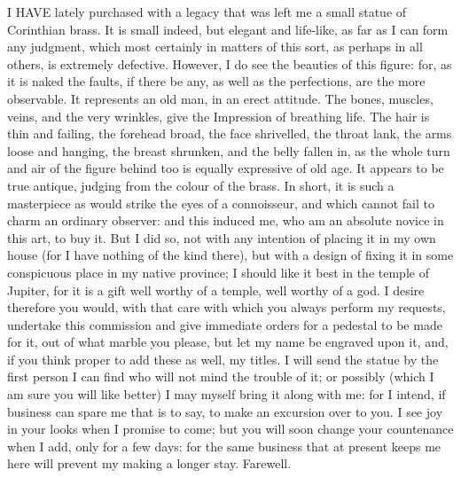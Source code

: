 
I HAVE lately purchased with a legacy that was left me a small statue of
Corinthian brass. It is small indeed, but elegant and life-like, as far as
I can form any judgment, which most certainly in matters of this sort, as
perhaps in all others, is extremely defective. However, I do see the
beauties of this figure: for, as it is naked the faults, if there be any,
as well as the perfections, are the more observable. It represents an old
man, in an erect attitude. The bones, muscles, veins, and the very
wrinkles, give the Impression of breathing life. The hair is thin and
failing, the forehead broad, the face shrivelled, the throat lank, the
arms loose and hanging, the breast shrunken, and the belly fallen in, as
the whole turn and air of the figure behind too is equally expressive of
old age. It appears to be true antique, judging from the colour of the
brass. In short, it is such a masterpiece as would strike the eyes of a
connoisseur, and which cannot fail to charm an ordinary observer: and this
induced me, who am an absolute novice in this art, to buy it. But I did
so, not with any intention of placing it in my own house (for I have
nothing of the kind there), but with a design of fixing it in some
conspicuous place in my native province; I should like it best in the
temple of Jupiter, for it is a gift well worthy of a temple, well worthy
of a god. I desire therefore you would, with that care with which you
always perform my requests, undertake this commission and give immediate
orders for a pedestal to be made for it, out of what marble you please,
but let my name be engraved upon it, and, if you think proper to add these
as well, my titles. I will send the statue by the first person I can find
who will not mind the trouble of it; or possibly (which I am sure you will
like better) I may myself bring it along with me: for I intend, if
business can spare me that is to say, to make an excursion over to you. I
see joy in your looks when I promise to come; but you will soon change
your countenance when I add, only for a few days: for the same business
that at present keeps me here will prevent my making a longer stay.
Farewell.


